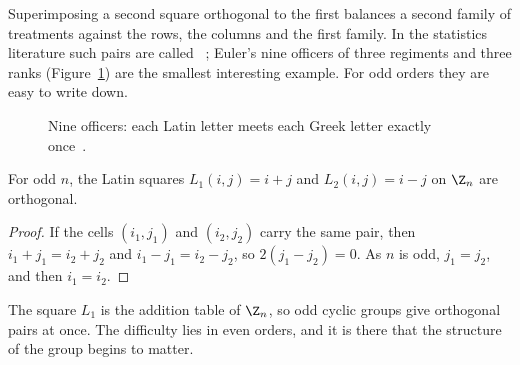 Superimposing a second square orthogonal to the first balances a second family of treatments against the rows, the columns and the first family. In the statistics literature such pairs are called ~\cite{dey17}; Euler's nine officers of three regiments and three ranks (Figure~\ref{fig:nine-officers}) are the smallest interesting example. For odd orders they are easy to write down.

\begin{figure}[ht]
\centering

\caption{Nine officers: each Latin letter meets each Greek letter exactly once~\cite{bai13}.}
\label{fig:nine-officers}
\end{figure}

\begin{proposition}\label{prop:odd-pair}
For odd $n$, the Latin squares $L_1(i,j)=i+j$ and $L_2(i,j)=i-j$ on $\Z_n$ are orthogonal.
\end{proposition}

\begin{proof}
If the cells $(i_1,j_1)$ and $(i_2,j_2)$ carry the same pair, then $i_1+j_1=i_2+j_2$ and $i_1-j_1=i_2-j_2$, so $2(j_1-j_2)=0$. As $n$ is odd, $j_1=j_2$, and then $i_1=i_2$.
\end{proof}

The square $L_1$ is the addition table of $\Z_n$, so odd cyclic groups give orthogonal pairs at once. The difficulty lies in even orders, and it is there that the structure of the group begins to matter.
